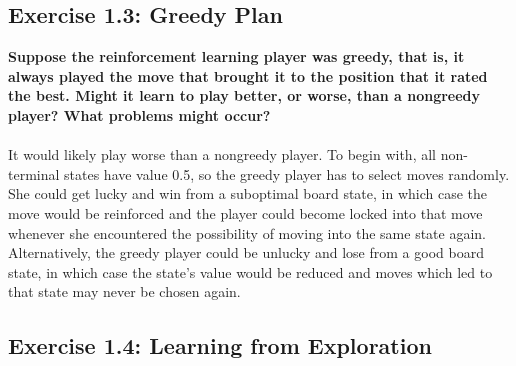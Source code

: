 \documentclass[a4paper,11pt]{article}
\numberwithin{equation}{section}
\theoremstyle{remark}
\begin{document}
\subsection{Exercise 1.3: Greedy Plan}

\textbf{Suppose the reinforcement learning player was greedy, that is, it always played the move that brought it to the position that it rated the best. Might it learn to play better, or worse, than a nongreedy player? What problems might occur?}
\\ \\
It would likely play worse than a nongreedy player. To begin with, all non-terminal states have value 0.5, so the greedy player has to select moves randomly. She could get lucky and win from a suboptimal board state, in which case the move would be reinforced and the player could become locked into that move whenever she encountered the possibility of moving into the same state again. Alternatively, the greedy player could be unlucky and lose from a good board state, in which case the state's value would be reduced and moves which led to that state may never be chosen again.


\subsection{Exercise 1.4: Learning from Exploration}
\end{document}
